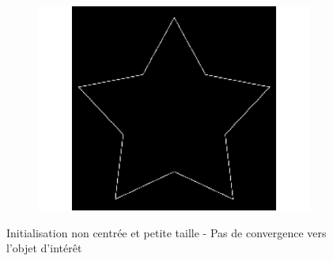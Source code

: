\begin{appendices}
\begin{figure}[H]
\begin{subfigure}[c]{0.3\linewidth}
\includegraphics[width=\textwidth]{Chapters/Images/Init/vfcus3}
\caption{}
\end{subfigure}
\caption{Initialisation non centrée et petite taille - Pas de convergence vers l'objet d'intérêt}
\end{figure}


\end{appendices}
